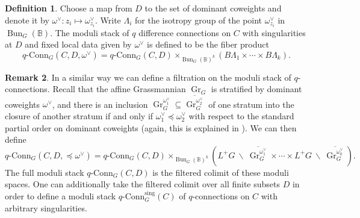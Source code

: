 \documentclass[11pt, oneside, reqno]{amsart}
\theoremstyle{definition} \newtheorem{definition}{Definition}[section]
\theoremstyle{definition} \newtheorem{remark}[definition]{Remark}
\theoremstyle{definition} \newtheorem{remarks}[definition]{Remarks}
\theoremstyle{definition} \newtheorem{question}[definition]{Question}
\theoremstyle{definition} \newtheorem*{note}{Note}
\theoremstyle{definition} \newtheorem{example}[definition]{Example}
\theoremstyle{definition} \newtheorem{examples}[definition]{Examples}
\newcommand{\bb}[1]{\mathbb{#1}}
\newcommand{\mr}[1]{\mathrm{#1}}
\newcommand{\bs}{\ \backslash \ }
\newcommand{\ol}[1]{\overline{#1}}
\newcommand{\sub}{\subseteq}
\DeclareMathOperator{\bun}{Bun}
\DeclareMathOperator{\Gr}{Gr}
\newcommand{\qconn}{q\text{-Conn}}
\begin{document}
\begin{definition}
Choose a map from $D$ to the set of dominant coweights and denote it by $\omega^\vee \colon z_i \mapsto \omega^\vee_{z_i}$.  Write $\Lambda_i$ for the isotropy group of the point $\omega^\vee_{z_i}$ in $\bun_G(\bb B)$. The moduli stack of $q$ difference connections on $C$ with singularities at $D$ and fixed local data given by $\omega^\vee$ is defined to be the fiber product
\[\qconn_G(C,D, \omega^\vee) = \qconn_G(C,D) \times_{\bun_G(\bb B)^k} (B\Lambda_1 \times \cdots \times B\Lambda_k).\]
\end{definition}

\begin{remark}\label{ind_structure_remark}
  In a similar way we can define a filtration on the moduli stack of
  $q$-connections.  Recall that the affine Grassmannian $\Gr_G$ is
  stratified by dominant coweights $\omega^\vee$, and there is an
  inclusion $\Gr_G^{\omega^\vee_1}\sub \ol{\Gr_G^{\omega^\vee_2}}$ of
  one stratum into the closure of another stratum if and only if
  $\omega^\vee_1 \preceq \omega^\vee_2$ with respect to the standard
  partial order on dominant coweights (again, this is explained in \cite{Zhu}).  We can then define
\[\qconn_G(C,D, \preceq \omega^\vee) = \qconn_G(C,D) \times_{\bun_G(\bb B)^k} \left(L^+G \!\!\bs\!\! \ol{\Gr_G^{\omega^\vee_1}} \times \cdots \times L^+G \!\!\bs\!\! \ol{\Gr_G^{\omega^\vee_k}}\right).\]
The full moduli stack $\qconn_G(C,D)$ is the filtered colimit of these moduli spaces.  One can additionally take the filtered colimit over all finite subsets $D$ in order to define a moduli stack $\qconn^\mr{sing}_G(C)$ of $q$-connections on $C$ with arbitrary singularities.
\end{remark}
\end{document}
